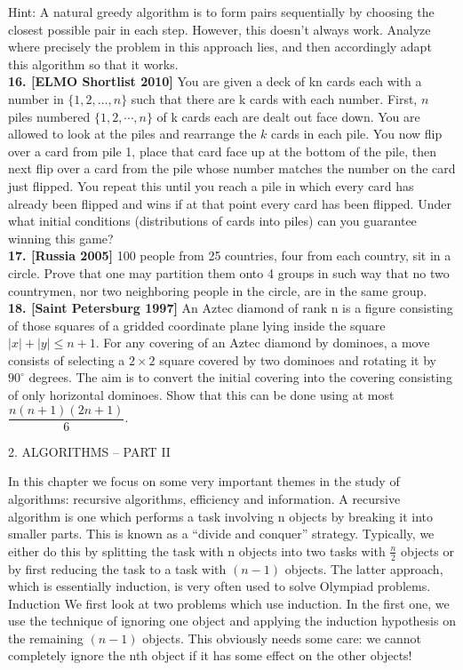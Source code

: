 \documentclass[a4paper,11pt]{book}
\begin{document}
Hint: A natural greedy algorithm is to form pairs sequentially
by choosing the closest possible pair in each step. However,
this doesn’t always work. Analyze where precisely the
problem in this approach lies, and then accordingly adapt this
algorithm so that it works.\\
\textbf{16. [ELMO Shortlist 2010]}
You are given a deck of kn cards each with a number in $\{1, 2,
…, n\}$ such that there are k cards with each number. First, $n$
piles numbered $\{1, 2, \cdots, n\}$ of k cards each are dealt out face
down. You are allowed to look at the piles and rearrange the $k$
cards in each pile. You now flip over a card from pile 1, place
that card face up at the bottom of the pile, then next flip over a
card from the pile whose number matches the number on the
card just flipped. You repeat this until you reach a pile in
which every card has already been flipped and wins if at that
point every card has been flipped. Under what initial
conditions (distributions of cards into piles) can you
guarantee winning this game?\\
\textbf{17. [Russia 2005]}
100 people from 25 countries, four from each country, sit in a
circle. Prove that one may partition them onto 4 groups in
such way that no two countrymen, nor two neighboring
people in the circle, are in the same group.\\
\textbf{18. [Saint Petersburg 1997]}
An Aztec diamond of rank n is a figure consisting of those
squares of a gridded coordinate plane lying inside the square
$|x| + |y| \le n+1$. For any covering of an Aztec diamond by
dominoes, a move consists of selecting a $2\times 2$ square covered
by two dominoes and rotating it by $90^{\circ}$ degrees. The aim is to
convert the initial covering into the covering consisting of only
horizontal dominoes. Show that this can be done using at most
$\dfrac{n(n+1)(2n+1)}{6}$.
\clearpage
\begin{LARGE}
\begin{center}
2. ALGORITHMS – PART II
\end{center}
\end{LARGE}

In this chapter we focus on some very important themes in the
study of algorithms: recursive algorithms, efficiency and
information. A recursive algorithm is one which performs a task
involving n objects by breaking it into smaller parts. This is known
as a “divide and conquer” strategy. Typically, we either do this by
splitting the task with n objects into two tasks with $\frac{n}{2}$ objects or
by first reducing the task to a task with $(n-1)$ objects. The latter
approach, which is essentially induction, is very often used to
solve Olympiad problems.
Induction
We first look at two problems which use induction. In the first
one, we use the technique of ignoring one object and applying the
induction hypothesis on the remaining $(n-1)$ objects. This
obviously needs some care: we cannot completely ignore the nth
object if it has some effect on the other objects!\\
\end{document}
